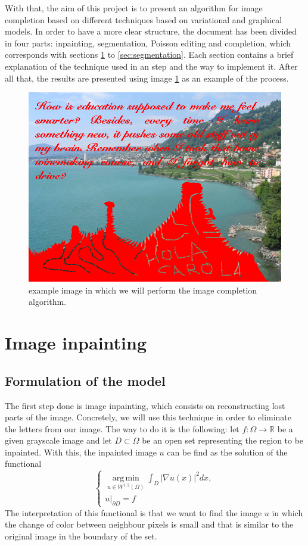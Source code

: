\documentclass[10pt,a4paper]{llncs}
\DeclareMathOperator*{\argmin}{arg\, min}
\begin{document}
\noindent
With that, the aim of this project is to present an algorithm for image completion based on different techniques based on variational and graphical models. In order to have a more clear structure, the document has been divided in four parts: inpainting, segmentation, Poisson editing and completion, which corresponds with sections \ref{sec:inpaint} to \ref{sec:segmentation}. Each section contains a brief explanation of the technique used in an step and the way to implement it. After all that, the results are presented using image \ref{img:goal_image} as an example of the process. 
\begin{figure}[b]
\begin{center}
\includegraphics[scale=0.6]{Goal_image}
\caption{example image in which we will perform the image completion algorithm.}
\label{img:goal_image}
\end{center}
\end{figure}
\section{Image inpainting}\label{sec:inpaint}
\subsection{Formulation of the model}
The first step done is image inpainting, which consists on reconstructing lost parts of the image. Concretely, we will use this technique in order to eliminate the letters from our image. The way to do it is the following: let $f:\Omega\rightarrow\mathbb{R}$ be a given grayscale image and let $D\subset\Omega$ be an open set representing the region to be inpainted. With this, the inpainted image $u$ can be find as the solution of the functional
\begin{equation}
\begin{cases}
\displaystyle\argmin\limits_{u\in W^{1,2}(\Omega)}\int _D |\nabla u(x)|^2dx,\\
u|_{\partial D} = f
\end{cases}
\label{eq:inpaint_funcional}
\end{equation}
The interpretation of this functional is that we want to find the image $u$ in which the change of color between neighbour pixels is small and that is similar to the original image in the boundary of the set.
\end{document}
